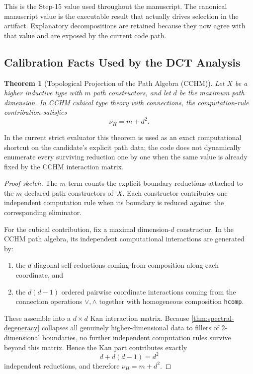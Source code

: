 \documentclass[11pt,a4paper]{article}
\theoremstyle{plain}
\newtheorem{theorem}{Theorem}[section]
\theoremstyle{definition}
\theoremstyle{remark}
\begin{document}
This is the Step-15 value used throughout the manuscript.
The canonical manuscript value is the executable result that actually drives selection in the artifact.
Explanatory decompositions are retained because they now agree with that value and are exposed by the current code path.

\subsection{Calibration Facts Used by the DCT Analysis}

\begin{theorem}[Topological Projection of the Path Algebra (CCHM)]
\label{thm:topological-projection}
Let $X$ be a higher inductive type with $m$ path constructors, and let $d$ be the maximum path dimension.
In CCHM cubical type theory with connections, the computation-rule contribution satisfies
\[
  \nu_H = m + d^2.
\]
\end{theorem}

\noindent In the current strict evaluator this theorem is used as an exact computational shortcut on the candidate's explicit path data; the code does not dynamically enumerate every surviving reduction one by one when the same value is already fixed by the CCHM interaction matrix.

\begin{proof}[Proof sketch]
The $m$ term counts the explicit boundary reductions attached to the $m$ declared path constructors of~$X$.
Each constructor contributes one independent computation rule when its boundary is reduced against the corresponding eliminator.

For the cubical contribution, fix a maximal dimension-$d$ constructor.
In the CCHM path algebra, its independent computational interactions are generated by:
\begin{enumerate}[nosep]
    \item the $d$ diagonal self-reductions coming from composition along each coordinate, and
    \item the $d(d-1)$ ordered pairwise coordinate interactions coming from the connection operations $\lor,\land$ together with homogeneous composition \texttt{hcomp}.
\end{enumerate}
These assemble into a $d \times d$ Kan interaction matrix.
Because \cref{thm:spectral-degeneracy} collapses all genuinely higher-dimensional data to fillers of 2-dimensional boundaries, no further independent computation rules survive beyond this matrix.
Hence the Kan part contributes exactly
\[
  d + d(d-1) = d^2
\]
independent reductions, and therefore $\nu_H = m + d^2$.
\end{proof}
\end{document}
